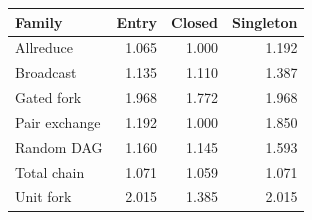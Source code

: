 \begin{tabular}{lrrr}\toprule
Family & Entry & Closed & Singleton\\\midrule
Allreduce & 1.065 & 1.000 & 1.192 \\
Broadcast & 1.135 & 1.110 & 1.387 \\
Gated fork & 1.968 & 1.772 & 1.968 \\
Pair exchange & 1.192 & 1.000 & 1.850 \\
Random DAG & 1.160 & 1.145 & 1.593 \\
Total chain & 1.071 & 1.059 & 1.071 \\
Unit fork & 2.015 & 1.385 & 2.015 \\
\bottomrule\end{tabular}
